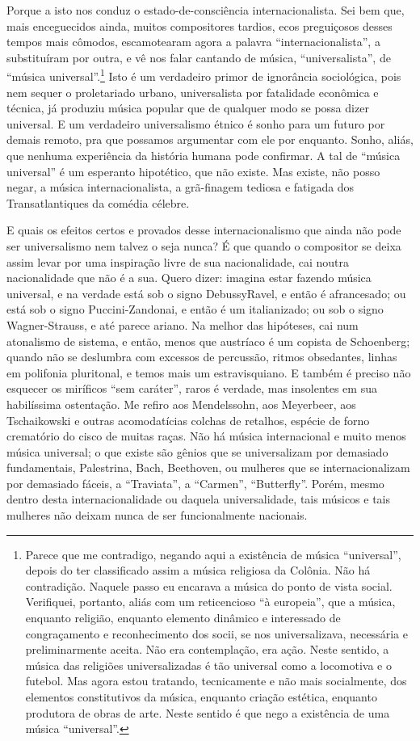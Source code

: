 Porque a isto nos conduz o estado-de-consciência internacionalista. Sei
bem que, mais enceguecidos ainda, muitos compositores tardios, ecos
preguiçosos desses tempos mais cômodos, escamotearam agora a palavra
``internacionalista'', a substituíram por outra, e vê nos falar cantando
de música, ``universalista'', de ``música universal''.\footnote{Parece que me contradigo, negando aqui a existência de música
``universal'', depois do ter classificado assim a música religiosa da
Colônia. Não há contradição. Naquele passo eu encarava a música do ponto
de vista social. Verifiquei, portanto, aliás com um reticencioso ``à
europeia'', que a música, enquanto religião, enquanto elemento dinâmico
e interessado de congraçamento e reconhecimento dos socii, se nos
universalizava, necessária e preliminarmente aceita. Não era
contemplação, era ação. Neste sentido, a música das religiões
universalizadas é tão universal como a locomotiva e o futebol. Mas agora
estou tratando, tecnicamente e não mais socialmente, dos elementos
constitutivos da música, enquanto criação estética, enquanto produtora
de obras de arte. Neste sentido é que nego a existência de uma música
``universal''.} Isto é um
verdadeiro primor de ignorância sociológica, pois nem sequer o
proletariado urbano, universalista por fatalidade econômica e técnica,
já produziu música popular que de qualquer modo se possa dizer
universal. E um verdadeiro universalismo étnico é sonho para um futuro
por demais remoto, pra que possamos argumentar com ele por enquanto.
Sonho, aliás, que nenhuma experiência da história humana pode confirmar.
A tal de ``música universal'' é um esperanto hipotético, que não existe.
Mas existe, não posso negar, a música internacionalista, a grã-finagem
tediosa e fatigada dos Transatlantiques da comédia célebre.

E quais os efeitos certos e provados desse internacionalismo que ainda
não pode ser universalismo nem talvez o seja nunca? É que quando o
compositor se deixa assim levar por uma inspiração livre de sua
nacionalidade, cai noutra nacionalidade que não é a sua. Quero dizer:
imagina estar fazendo música universal, e na verdade está sob o signo
DebussyRavel, e então é afrancesado; ou está sob o signo
Puccini-Zandonai, e então é um italianizado; ou sob o signo
Wagner-Strauss, e até parece ariano. Na melhor das hipóteses, cai num
atonalismo de sistema, e então, menos que austríaco é um copista de
Schoenberg; quando não se deslumbra com excessos de percussão, ritmos
obsedantes, linhas em polifonia pluritonal, e temos mais um
estravisquiano. E também é preciso não esquecer os miríficos ``sem
caráter'', raros é verdade, mas insolentes em sua habilíssima
ostentação. Me refiro aos Mendelssohn, aos Meyerbeer, aos Tschaikowski e
outras acomodatícias colchas de retalhos, espécie de forno crematório do
cisco de muitas raças. Não há música internacional e muito menos música
universal; o que existe são gênios que se universalizam por demasiado
fundamentais, Palestrina, Bach, Beethoven, ou mulheres que se
internacionalizam por demasiado fáceis, a ``Traviata'', a ``Carmen'',
``Butterfly''. Porém, mesmo dentro desta internacionalidade ou daquela
universalidade, tais músicos e tais mulheres não deixam nunca de ser
funcionalmente nacionais.

